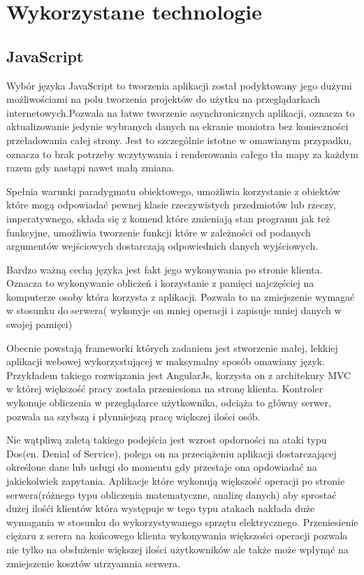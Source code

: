 \section{Wykorzystane technologie}
\label{sec:wykorzystanetechnologie} 

\subsection{JavaScript}
\label{sec:javascript}

Wybór języka JavaScript to tworzenia aplikacji został podyktowany jego dużymi możliwościami na polu tworzenia projektów do użytku na przeglądarkach internetowych.Pozwala na łatwe tworzenie asynchronicznych aplikacji, oznacza to aktualizowanie jedynie wybranych danych na ekranie moniotra bez konieczności przeładowania całej strony. Jest to szczególnie istotne w omawianym przypadku, oznacza to brak potrzeby wczytywania i renderowania całego tła mapy za każdym razem gdy nastąpi nawet małą zmiana.


Spełnia warunki paradygmatu obiektowego, umożliwia korzystanie z obiektów które mogą odpowiadać pewnej klasie rzeczywistych przedmiotów lub rzeczy, imperatywnego, składa się z komend które zmieniają stan programu jak też funkcyjne, umożliwia tworzenie funkcji które w zależności od podanych argumentów wejściowych dostarczają odpowiednich danych wyjściowych.

Bardzo ważną cechą języka jest fakt jego wykonywania po stronie klienta. Oznacza to wykonywanie obliczeń i korzystanie z pamięci najczęściej na komputerze osoby która korzysta z aplikacji. Pozwala to na zmiejszenie wymagać w stosunku do serwera( wykonyje on mniej operacji i zapisuje mniej danych w swojej pamięci)

Obecnie powstają frameworki których zadaniem jest stworzenie małej, lekkiej aplikacji webowej wykorzystującej w maksymalny sposób omawiany język.\cite{AngularJS} Przykładem takiego rozwiązania jest AngularJs, korzysta on z architekury MVC w której większość pracy została przeniesiona na stronę klienta. Kontroler wykonuje obliczenia w przeglądarce użytkownika, odciąża to główny serwer, pozwala na szybszą i płynniejszą pracę większej ilości osób.

Nie wątpliwą zaletą takiego podejścia jest wzrost opdorności na ataki typu Dos(en. Denial of Service), polega on na przeciążeniu aplikacji dostarczającej określone dane lub usługi do momentu gdy przestaje ona opdowiadać na jakiekolwiek zapytania. Aplikacje które wykonują większość operacji po stronie serwera(różnego typu obliczenia matematyczne, analizę danych) aby sprostać dużej ilośći klientów która występuje w tego typu atakach nakłada duże wymagania w stosunku do wykorzystywanego sprzętu elektrycznego. Przeniesienie ciężaru z serera na końcowego klienta wykonywania większości operacji pozwala nie tylko na obsłużenie większej ilości użytkowników ale także może wpłynąć na zmiejszenie kosztów utrzyamnia serwera.

